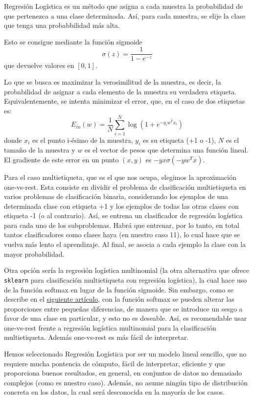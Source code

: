 \documentclass[a4]{article}
\begin{document}
Regresión Logística es un método que asigna a cada muestra la probabilidad de que pertenezca a una clase determinada. Así, para cada muestra, se elije la clase que tenga una probabbilidad más alta. 
 
Esto se consigue mediante la función sigmoide
 $$\sigma(z)=\frac{1}{1-e^{-z}}$$ 
  que devuelve valores en $[0,1]$. 

Lo que se busca es maximizar la verosimilitud de la muestra, es decir, la probabilidad de asignar a cada elemento de la muestra su verdadera etiqueta. Equivalentemente, se intenta minimizar el error, que, en el caso de dos etiquetas es:
$$E_{in}(w)=\frac{1}{N}\sum_{i=1}^{N}\log(1+e^{-y_iw^Tx_i})$$
donde $x_i$ es el punto i-ésimo de la muestra, $y_i$ es su etiqueta (+1 o -1), $ N $ es el tamaño de la muestra y $ w $ es el vector de pesos que determina una función lineal.
El gradiente de este error en un punto $(x,y)$ es $-yx\sigma(-yw^Tx)$.

Para el caso multietiqueta, que es el que nos ocupa, elegimos la aproximación one-vs-rest. Esta consiste en dividir el problema de clasificación multietiqueta en varios problemas de clasificación binaria, considerando los ejemplos de una determinada clase con etiqueta +1 y los ejemplos de todas las otras clases con etiqueta -1 (o al contrario). Así, se entrena un clasificador de regresión logística para cada uno de los subproblemas. Habrá que entrenar, por lo tanto, en total tantos clasificadores como clases haya (en nuestro caso 11), lo cual hace que se vuelva más lento el aprendizaje. Al final, se asocia a cada ejemplo la clase con la mayor probabilidad. 

Otra opción sería la regresión logística multinomial (la otra alternativa que ofrece \lstinline|sklearn| para clasificación multietiqueta con regresión logística), la cual hace uso de la función softmax en lugar de la función sigmoide. Sin embargo, como se describe en el \href{https://medium.com/@jjw92abhi/is-logistic-regression-a-good-multi-class-classifier-ad20fecf1309}{siguiente artículo}, con la función softmax se pueden alterar las proporciones entre pequeñas diferencias, de manera que se introduce un sesgo a favor de una clase en particular, y esto no es deseable. Así, es recomendable usar one-vs-rest frente a regresión logística multinomial para la clasificación multietiqueta. Además one-vs-rest es más fácil de interpretar. 

Hemos seleccionado Regresión Logística por ser un modelo lineal sencillo, que no requiere mucha pontencia de cómputo, fácil de interpretar, eficiente y que proporciona buenos resultados, en general,  en conjuntos de datos no demasiado complejos (como es nuestro caso). Además, no asume ningún tipo de distribución concreta en los datos, la cual será desconocida en la mayoría de los casos. 
\end{document}
